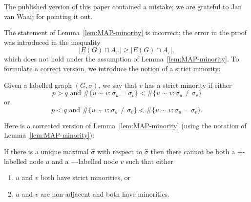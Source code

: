 \documentclass[EJP,final]{ejpecp}
\newcommand{\1}[1]{\mathbbm{1}_{\{#1\}}}
\begin{document}
The published version of this paper contained a mistake; we are grateful to Jan van Waaij for
pointing it out.

The statement of Lemma~\ref{lem:MAP-minority} is incorrect; the error in the proof was introduced in the inequality
\[
    |E(G) \cap A_{\tau'}| \ge |E(G) \cap A_\tau|,
\]
which does not hold under the assumption of Lemma~\ref{lem:MAP-minority}.
To formulate a correct version, we introduce the notion of a strict minority:
\begin{definition}
    Given a labelled graph $(G, \sigma)$, we say that $v$ has a strict minority if either
    \[
        p > q \text{ and } \#\{u \sim v: \sigma_u = \sigma_v\} < \#\{u \sim v: \sigma_u \ne \sigma_v\} 
    \]
    or
    \[
        p < q \text{ and } \#\{u \sim v: \sigma_u \ne \sigma_v\} < \#\{u \sim v: \sigma_u = \sigma_v\} .
    \]
\end{definition}

Here is a corrected version of Lemma~\ref{lem:MAP-minority} (using the notation of Lemma~\ref{lem:MAP-minority}):

\begin{lemma}\label{lem:MAP-minority-correct}
    If there is a unique maximal $\hat \sigma$ with respect to $\hat \sigma$ then there cannot
    be both a $+$-labelled node $u$ and a $-$-labelled node $v$ such that either
    \begin{enumerate}
        \item $u$ and $v$ both have strict minorities, or
        \item $u$ and $v$ are non-adjacent and both have minorities.
    \end{enumerate}
\end{lemma}
\end{document}
